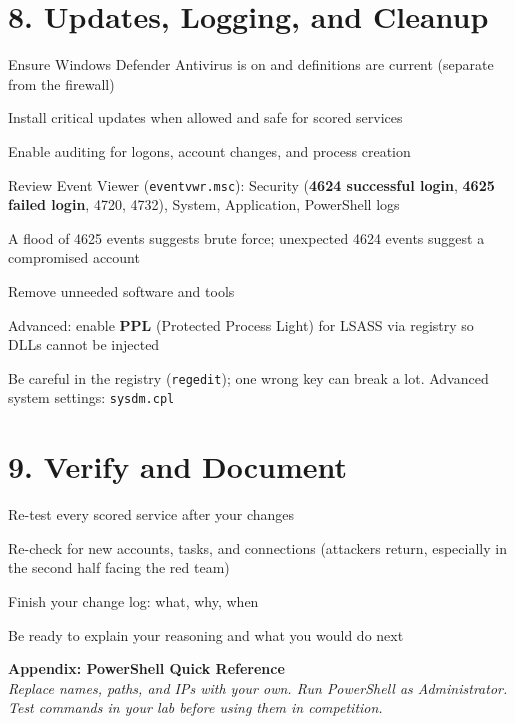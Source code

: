 \documentclass[11pt]{article}
\newcommand{\cmd}[1]{\texttt{\small #1}}
\begin{document}
\section*{8. Updates, Logging, and Cleanup}
\begin{mycheck}
  \item Ensure Windows Defender Antivirus is on and definitions are current (separate from the firewall)
  \item Install critical updates when allowed and safe for scored services
  \item Enable auditing for logons, account changes, and process creation
  \item Review Event Viewer (\cmd{eventvwr.msc}): Security (\textbf{4624 successful login}, \textbf{4625 failed login}, 4720, 4732), System, Application, PowerShell logs
  \item A flood of 4625 events suggests brute force; unexpected 4624 events suggest a compromised account
  \item Remove unneeded software and tools
  \item Advanced: enable \textbf{PPL} (Protected Process Light) for LSASS via registry so DLLs cannot be injected
  \item Be careful in the registry (\cmd{regedit}); one wrong key can break a lot. Advanced system settings: \cmd{sysdm.cpl}
\end{mycheck}

\section*{9. Verify and Document}
\begin{mycheck}
  \item Re-test every scored service after your changes
  \item Re-check for new accounts, tasks, and connections (attackers return, especially in the second half facing the red team)
  \item Finish your change log: what, why, when
  \item Be ready to explain your reasoning and what you would do next
\end{mycheck}

\newpage
{\LARGE\bfseries\color{accent} Appendix: PowerShell Quick Reference}\\[2pt]
\textit{Replace names, paths, and IPs with your own. Run PowerShell as Administrator. Test commands in your lab before using them in competition.}
\end{document}
